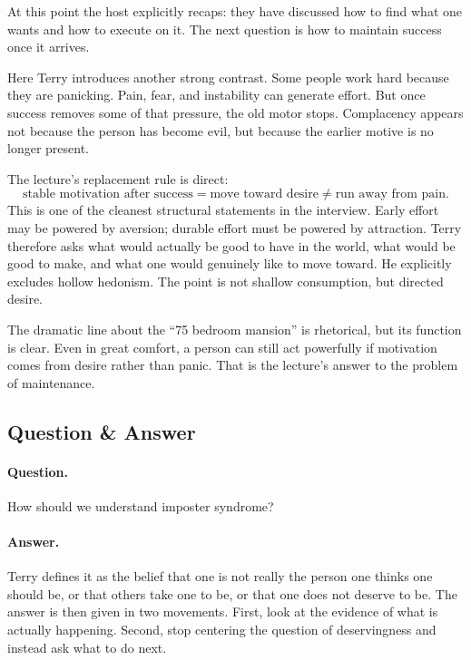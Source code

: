 At this point the host explicitly recaps: they have discussed how to find what one wants and how to execute on it. The next question is how to maintain success once it arrives.

Here Terry introduces another strong contrast. Some people work hard because they are panicking. Pain, fear, and instability can generate effort. But once success removes some of that pressure, the old motor stops. Complacency appears not because the person has become evil, but because the earlier motive is no longer present.

The lecture's replacement rule is direct:
\begin{equation}
\text{stable motivation after success}
=
\text{move toward desire}
\neq
\text{run away from pain}.
\end{equation}
This is one of the cleanest structural statements in the interview. Early effort may be powered by aversion; durable effort must be powered by attraction. Terry therefore asks what would actually be good to have in the world, what would be good to make, and what one would genuinely like to move toward. He explicitly excludes hollow hedonism. The point is not shallow consumption, but directed desire.

The dramatic line about the ``75 bedroom mansion'' is rhetorical, but its function is clear. Even in great comfort, a person can still act powerfully if motivation comes from desire rather than panic. That is the lecture's answer to the problem of maintenance.

\subsection{Question \& Answer}

\paragraph{Question.} How should we understand imposter syndrome?

\paragraph{Answer.} Terry defines it as the belief that one is not really the person one thinks one should be, or that others take one to be, or that one does not deserve to be. The answer is then given in two movements. First, look at the evidence of what is actually happening. Second, stop centering the question of deservingness and instead ask what to do next.


